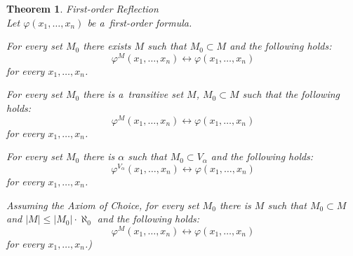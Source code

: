 \documentclass[12pt,a4paper]{article}
\newtheorem{theorem}{Theorem}[section]
\renewcommand{\iff}{\leftrightarrow}
\newcommand{\bce}{\begin{compactenum}}
\newcommand{\ece}{\end{compactenum}}
\begin{document}
\begin{theorem}{First-order Reflection}\label{theorem:first_order_reflection}\\
Let $\varphi(x_1, \ldots, x_n)$ be a~first-order formula.
\bce[(i)]
\item For every set $M_0$ there exists $M$ such that $M_0 \subset M$ and the following holds:
\begin{equation}
\varphi^M(x_1, \ldots, x_n) \iff \varphi(x_1, \ldots, x_n)
\end{equation}
for every $x_1, \ldots, x_n$.

\item For every set $M_0$  there is a~transitive set $M$, $M_0 \subset M$ such that the following holds:
\begin{equation}
\varphi^M(x_1, \ldots, x_n) \iff \varphi(x_1, \ldots, x_n)
\end{equation}
for every $x_1, \ldots, x_n$.

\item For every set $M_0$ there is $\alpha$ such that $M_0 \subset V_{\alpha}$ and the following holds:
\begin{equation}
\varphi^{V_{\alpha}}(x_1, \ldots, x_n) \iff \varphi(x_1, \ldots, x_n)
\end{equation}
for every $x_1, \ldots, x_n$.

\item Assuming the Axiom of Choice, for every set $M_0$ there is $M$ such that $M_0 \subset M$ and $|M| \leq |M_0| \cdot \aleph_0$ and the following holds:
\begin{equation}
\varphi^M(x_1, \ldots, x_n) \iff \varphi(x_1, \ldots, x_n)
\end{equation}
for every $x_1, \ldots, x_n$.)
\ece
\end{theorem}
\end{document}
